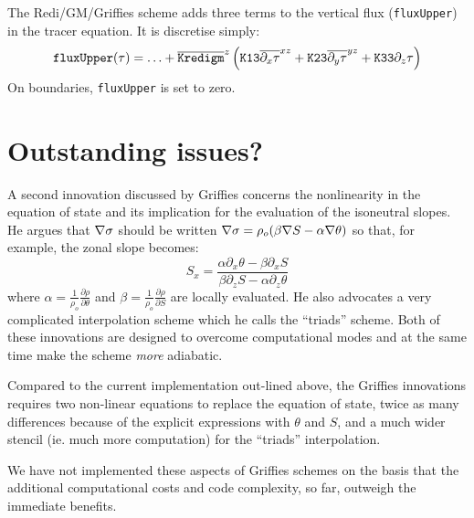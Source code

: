\documentclass[12pt]{article}
\begin{document}
The Redi/GM/Griffies scheme adds three terms to the vertical flux
({\tt fluxUpper}) in the tracer equation. It is discretise simply:
\begin{displaymath}
{\tt fluxUpper}(\tau) = \ldots + \overline{\tt Kredigm}^z 
\left( 
{\tt K13} \overline{\partial_x \tau}^{xz} +
{\tt K23} \overline{\partial_y \tau}^{yz} +
{\tt K33} \partial_z \tau
\right)
\end{displaymath}
On boundaries, {\tt fluxUpper} is set to zero.

\section{Outstanding issues?}

A second innovation discussed by Griffies concerns the nonlinearity in
the equation of state and its implication for the evaluation of the
isoneutral slopes. He argues that ${\bf \nabla} \sigma$ should be
written ${\bf \nabla} \sigma = \rho_o ( \beta {\bf \nabla} S - \alpha
{\bf \nabla} \theta )$ so that, for example, the zonal slope becomes:
\begin{displaymath}
S_x = \frac{ \alpha \partial_x \theta - \beta \partial_x S }{ \beta
\partial_z S - \alpha \partial_z \theta }
\end{displaymath}
where $\alpha=\frac{1}{\rho_o} \frac{\partial \rho}{\partial \theta}$
and $\beta=\frac{1}{\rho_o} \frac{\partial \rho}{\partial S}$ are
locally evaluated. He also advocates a very complicated interpolation
scheme which he calls the ``triads'' scheme. Both of these innovations
are designed to overcome computational modes and at the same time make
the scheme {\em more} adiabatic.

Compared to the current implementation out-lined above, the Griffies
innovations requires two non-linear equations to replace the equation
of state, twice as many differences because of the explicit
expressions with $\theta$ and $S$, and a much wider stencil (ie. much
more computation) for the ``triads'' interpolation.

We have not implemented these aspects of Griffies schemes on the basis
that the additional computational costs and code complexity, so far,
outweigh the immediate benefits.
\end{document}
